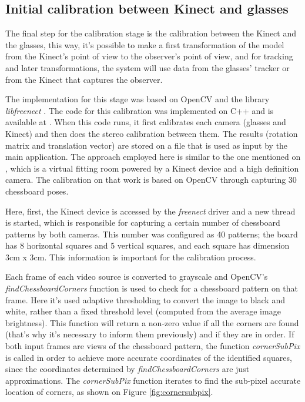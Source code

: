 \documentclass[msc, a4paper, classic, en]{ufbathesis}
\begin{document}
\subsection{Initial calibration between Kinect and glasses}
\label{sec:kinect2glasses}

The final step for the calibration stage is the calibration between the Kinect and the glasses, this way, it's possible to make a first transformation of the model from the Kinect's point of view to the observer's point of view, and for tracking and later transformations, the system will use data from the glasses' tracker or from the Kinect that captures the observer.

The implementation for this stage was based on OpenCV \cite{opencv} and the library \textit{libfreenect} \cite{openkinect}. The code for this calibration was implemented on C++ and is available at \cite{masterproject}. When this code runs, it first calibrates each camera (glasses and Kinect) and then does the stereo calibration between them. The results (rotation matrix and translation vector) are stored on a file that is used as input by the main application. The approach employed here is similar to the one mentioned on \cite{tryon}, which is a virtual fitting room powered by a Kinect device and a high definition camera. The calibration on that work is based on OpenCV through capturing 30 chessboard poses.

Here, first, the Kinect device is accessed by the \textit{freenect} driver and a new thread is started, which is responsible for capturing a certain number of chessboard patterns by both cameras. This number was configured as 40 patterns; the board has 8 horizontal squares and 5 vertical squares, and each square has dimension 3cm x 3cm. This information is important for the calibration process.

Each frame of each video source is converted to grayscale and OpenCV's \textit{findChessboardCorners} function is used to check for a chessboard pattern on that frame. Here it's used adaptive thresholding to convert the image to black and white, rather than a fixed threshold level (computed from the average image brightness). This function will return a non-zero value if all the corners are found (that's why it's necessary to inform them previously) and if they are in order. If both input frames are views of the chessboard pattern, the function \textit{cornerSubPix} is called in order to achieve more accurate coordinates of the identified squares, since the coordinates determined by \textit{findChessboardCorners} are just approximations. The \textit{cornerSubPix} function iterates to find the sub-pixel accurate location of corners, as shown on Figure \ref{fig:cornersubpix}.
\end{document}
